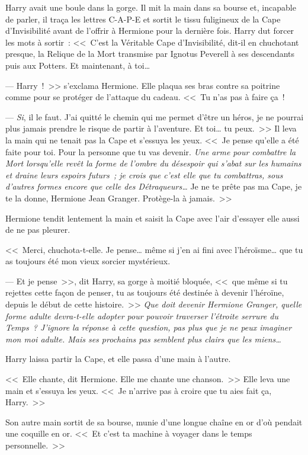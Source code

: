 Harry avait une boule dans la gorge. Il mit la main dans sa bourse et, incapable de parler, il traça les lettres C-A-P-E et sortit le tissu fuligineux de la Cape d'Invisibilité avant de l'offrir à Hermione pour la dernière fois. Harry dut forcer les mots à sortir~: <<~C'est la Véritable Cape d'Invisibilité, dit-il en chuchotant presque, la Relique de la Mort transmise par Ignotus Peverell à ses descendants puis aux Potters. Et maintenant, à toi…

--- Harry~!~>> s'exclama Hermione. Elle plaqua ses bras contre sa poitrine comme pour se protéger de l'attaque du cadeau. <<~Tu n'as pas à faire ça~!

--- \emph{Si}, il le faut. J'ai quitté le chemin qui me permet d'être un héros, je ne pourrai plus jamais prendre le risque de partir à l'aventure. Et toi… tu peux.~>> Il leva la main qui ne tenait pas la Cape et s'essuya les yeux. <<~Je pense qu'elle a été faite pour toi. Pour la personne que tu vas devenir. \emph{Une arme pour combattre la Mort lorsqu'elle revêt la forme de l'ombre du désespoir qui s'abat sur les humains et draine leurs espoirs futurs~; je crois que c'est elle que tu combattras, sous d'autres formes encore que celle des Détraqueurs…} Je ne te prête pas ma Cape, je te la donne, Hermione Jean Granger. Protège-la à jamais.~>>

Hermione tendit lentement la main et saisit la Cape avec l'air d'essayer elle aussi de ne pas pleurer.

<<~Merci, chuchota-t-elle. Je pense… même si j'en ai fini avec l'héroïsme… que tu as toujours été mon vieux sorcier mystérieux.

--- Et je pense~>>, dit Harry, sa gorge à moitié bloquée, <<~que même si tu rejettes cette façon de penser, tu as toujours été destinée à devenir l'héroïne, depuis le début de cette histoire.~>> \emph{Que doit devenir Hermione Granger, quelle forme adulte devra-t-elle adopter pour pouvoir traverser l'étroite serrure du Temps~? J'ignore la réponse à cette question, pas plus que je ne peux imaginer mon moi adulte. Mais ses prochains pas semblent plus clairs que les miens…}

Harry laissa partir la Cape, et elle passa d'une main à l'autre.

<<~Elle chante, dit Hermione. Elle me chante une chanson.~>> Elle leva une main et s'essuya les yeux. <<~Je n'arrive pas à croire que tu aies fait ça, Harry.~>>

Son autre main sortit de sa bourse, munie d'une longue chaîne en or d'où pendait une coquille en or. <<~Et c'est ta machine à voyager dans le temps personnelle.~>>

